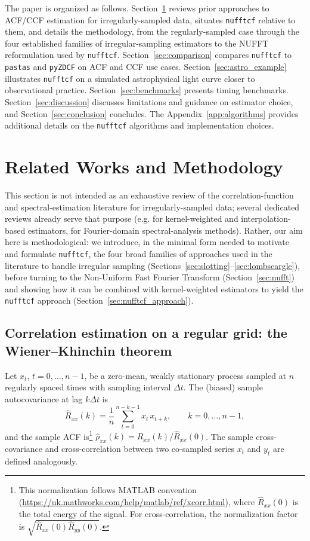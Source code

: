 \documentclass[twocolumn,10pt]{article}
\newcommand{\nufftcf}{\texttt{nufftcf}\xspace}
\newcommand{\pastas}{\texttt{pastas}\xspace}
\newcommand{\pyzdcf}{\texttt{pyZDCF}\xspace}
\begin{document}
The paper is organized as follows.
Section~\ref{sec:related_methodology} reviews prior approaches to ACF/CCF estimation for irregularly-sampled data,
situates \nufftcf relative to them, and details the methodology, from the regularly-sampled case through the four established families of irregular-sampling estimators to the NUFFT reformulation used by \nufftcf.
Section~\ref{sec:comparison} compares \nufftcf to \pastas and \pyzdcf on ACF and CCF use cases.
Section~\ref{sec:astro_example} illustrates \nufftcf on a simulated astrophysical light curve closer to observational practice.
Section~\ref{sec:benchmarks} presents timing benchmarks.
Section~\ref{sec:discussion} discusses limitations and guidance on estimator choice, and Section~\ref{sec:conclusion} concludes. The Appendix~\ref{app:algorithms} provides additional details on the \nufftcf  algorithms and implementation choices.
%
\section{Related Works and Methodology}
\label{sec:related_methodology}
This section is not intended as an exhaustive review of the correlation-function
and spectral-estimation literature for irregularly-sampled data; several
dedicated reviews already serve that purpose (e.g. \cite{Rehfeld2011} for
kernel-weighted and interpolation-based estimators, \cite{BABU2010359} for
Fourier-domain spectral-analysis methods). Rather, our aim here is
methodological: we introduce, in the minimal form needed to motivate and
formulate \nufftcf, the four broad families of approaches used in the
literature to handle irregular sampling (Sections~\ref{sec:slotting}--\ref{sec:lombscargle}),
before turning to the Non-Uniform Fast Fourier Transform
(Section~\ref{sec:nufft}) and showing how it can be combined with
kernel-weighted estimators to yield the \nufftcf approach
(Section~\ref{sec:nufftcf_approach}).
%
\subsection{Correlation estimation on a regular grid: the Wiener--Khinchin theorem}
\label{sec:wk_regular}
%
Let $x_t$, $t = 0,\dots,n-1$, be a zero-mean, weakly stationary process sampled at $n$ regularly spaced times with sampling interval $\Delta t$. The (biased) sample autocovariance at lag $k\Delta t$ is
\begin{equation}
\hat R_{xx}(k)=\frac{1}{n}\sum_{t=0}^{n-k-1}x_t\,x_{t+k},
\qquad
k=0,\dots,n-1,
\label{eq:acf_regular}
\end{equation}
and the sample ACF is\footnote{This normalization follows MATLAB convention (\url{https://uk.mathworks.com/help/matlab/ref/xcorr.html}), where $\hat{R}_{xx}(0)$ is the total energy of the signal. For cross-correlation, the normalization factor is $\sqrt{\hat{R}_{xx}(0)\hat{R}_{yy}(0)}$.} $\hat\rho_{xx}(k)=\hat R_{xx}(k)/\hat R_{xx}(0)$. The sample cross-covariance and cross-correlation between two co-sampled series $x_t$ and $y_t$ are defined analogously.
\end{document}
